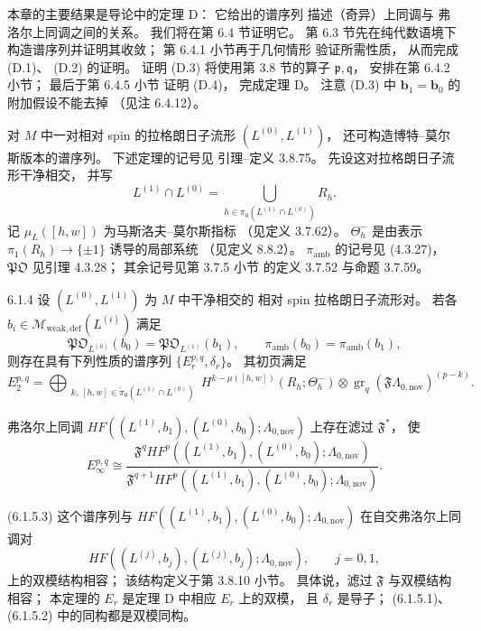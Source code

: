 本章的主要结果是导论中的定理 D：
它给出的谱序列
描述（奇异）上同调与
弗洛尔上同调之间的关系。
我们将在第 6.4 节证明它。
第 6.3 节先在纯代数语境下
构造谱序列并证明其收敛；
第 6.4.1 小节再于几何情形
验证所需性质，
从而完成 \textup{(D.1)}、
\textup{(D.2)} 的证明。
证明 \textup{(D.3)}
将使用第 3.8 节的算子
$\mathfrak p,\mathfrak q$，
安排在第 6.4.2 小节；
最后于第 6.4.5 小节
证明 \textup{(D.4)}，
完成定理 D。
注意 \textup{(D.3)} 中
$\mathbf b_1=\mathbf b_0$
的附加假设不能去掉
（见注 6.4.12）。

对 $M$ 中一对相对 spin
的拉格朗日子流形
$(L^{(0)},L^{(1)})$，
还可构造博特--莫尔斯版本的谱序列。
下述定理的记号见
引理--定义 3.8.75。
先设这对拉格朗日子流形干净相交，
并写
\[
L^{(1)}\cap L^{(0)}
=
\bigcup_{h\in\pi_0(L^{(1)}\cap L^{(0)})}
R_h.
\]
记 $\mu_L([h,w])$
为马斯洛夫--莫尔斯指标
（见定义 3.7.62）。
$\Theta^-_h$
是由表示
$\pi_1(R_h)\to\{\pm1\}$
诱导的局部系统
（见定义 8.8.2）。
$\pi_{\mathrm{amb}}$ 的记号见
(4.3.27)，
$\mathfrak{PO}$ 见引理 4.3.28；
其余记号见第 3.7.5 小节
的定义 3.7.52 与命题 3.7.59。

\begin{theorem}{6.1.4}\label{thm:6-1-4}
设 $(L^{(0)},L^{(1)})$
为 $M$ 中干净相交的
相对 spin 拉格朗日子流形对。
若各
$b_i\in\mathcal M_{\mathrm{weak,def}}(L^{(i)})$
满足
\[
\mathfrak{PO}_{L^{(0)}}(b_0)
=\mathfrak{PO}_{L^{(1)}}(b_1),
\qquad
\pi_{\mathrm{amb}}(b_0)
=\pi_{\mathrm{amb}}(b_1),
\]
则存在具有下列性质的谱序列
$\{E_r^{p,q},\delta_r\}$。
其初页满足
\begin{equation}
E_2^{p,q}
=
\bigoplus_{\substack{
k,\,[h,w]\in
\widetilde{\pi}_0(L^{(1)}\cap L^{(0)})
}}
H^{k-\mu([h,w])}(R_h;\Theta^-_h)
\otimes
\operatorname{gr}_q
(\mathfrak F\Lambda_{0,\mathrm{nov}})^{(p-k)}.
\tag{6.1.5.1}\label{eq:6-1-5-1}
\end{equation}

弗洛尔上同调
$HF((L^{(1)},b_1),(L^{(0)},b_0);
\Lambda_{0,\mathrm{nov}})$
上存在滤过 $\mathfrak F^*$，
使
\begin{equation}
E_\infty^{p,q}
\cong
\frac{
\mathfrak F^q HF^p
((L^{(1)},b_1),(L^{(0)},b_0);
\Lambda_{0,\mathrm{nov}})
}{
\mathfrak F^{q+1} HF^p
((L^{(1)},b_1),(L^{(0)},b_0);
\Lambda_{0,\mathrm{nov}})
}.
\tag{6.1.5.2}\label{eq:6-1-5-2}
\end{equation}

\par\smallskip\noindent\textup{(6.1.5.3)}\quad
这个谱序列与
$HF((L^{(1)},b_1),(L^{(0)},b_0);
\Lambda_{0,\mathrm{nov}})$
在自交弗洛尔上同调对
\[
HF((L^{(j)},b_j),(L^{(j)},b_j);
\Lambda_{0,\mathrm{nov}}),
\qquad j=0,1,
\]
上的双模结构相容；
该结构定义于第 3.8.10 小节。
具体说，滤过 $\mathfrak F$
与双模结构相容；
本定理的 $E_r$
是定理 D 中相应 $E_r$ 上的双模，
且 $\delta_r$ 是导子；
\textup{(6.1.5.1)}、
\textup{(6.1.5.2)}
中的同构都是双模同构。
\end{theorem}


